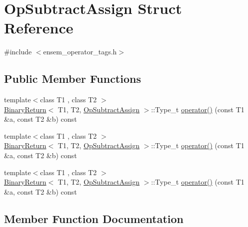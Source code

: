 \hypertarget{structOpSubtractAssign}{}\section{Op\+Subtract\+Assign Struct Reference}
\label{structOpSubtractAssign}


{\ttfamily \#include $<$ensem\+\_\+operator\+\_\+tags.\+h$>$}

\subsection*{Public Member Functions}
\begin{DoxyCompactItemize}
\item 
{\footnotesize template$<$class T1 , class T2 $>$ }\\\mbox{\hyperlink{structBinaryReturn}{Binary\+Return}}$<$ T1, T2, \mbox{\hyperlink{structOpSubtractAssign}{Op\+Subtract\+Assign}} $>$\+::Type\+\_\+t \mbox{\hyperlink{structOpSubtractAssign_aad45a22054a0f7d5a0fd7c283e84661d}{operator()}} (const T1 \&a, const T2 \&b) const
\item 
{\footnotesize template$<$class T1 , class T2 $>$ }\\\mbox{\hyperlink{structBinaryReturn}{Binary\+Return}}$<$ T1, T2, \mbox{\hyperlink{structOpSubtractAssign}{Op\+Subtract\+Assign}} $>$\+::Type\+\_\+t \mbox{\hyperlink{structOpSubtractAssign_aad45a22054a0f7d5a0fd7c283e84661d}{operator()}} (const T1 \&a, const T2 \&b) const
\item 
{\footnotesize template$<$class T1 , class T2 $>$ }\\\mbox{\hyperlink{structBinaryReturn}{Binary\+Return}}$<$ T1, T2, \mbox{\hyperlink{structOpSubtractAssign}{Op\+Subtract\+Assign}} $>$\+::Type\+\_\+t \mbox{\hyperlink{structOpSubtractAssign_aad45a22054a0f7d5a0fd7c283e84661d}{operator()}} (const T1 \&a, const T2 \&b) const
\end{DoxyCompactItemize}


\subsection{Member Function Documentation}
\mbox{\label{structOpSubtractAssign_aad45a22054a0f7d5a0fd7c283e84661d}} 

